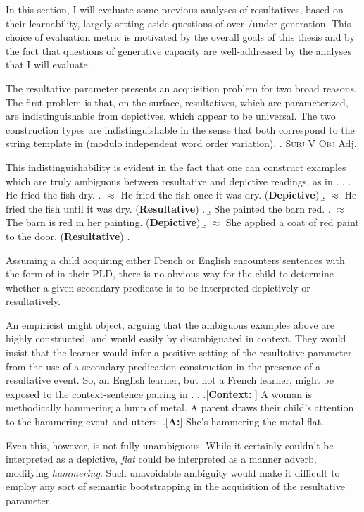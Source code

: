 \documentclass[MilwayThesis]{subfiles}
\begin{document}
In this section, I will evaluate some previous analyses of resultatives, based on their learnability, largely setting aside questions of over-/under-generation.
This choice of evaluation metric is motivated by the overall goals of this thesis and by the fact that questions of generative capacity are well-addressed by the analyses that I will evaluate.

The resultative parameter presents an acquisition problem for two broad reasons.
The first problem is that, on the surface, resultatives, which are parameterized, are indistinguishable from depictives, which appear to be universal.
The two construction types are indistinguishable in the sense that both correspond to the string template in \Next (modulo independent word order variation).
\ex. \textsc{Subj} V \textsc{Obj} Adj.

This indistinguishability is evident in the fact that one can construct examples which are truly ambiguous between resultative and depictive readings, as in \Next.
\ex. 
\a. He fried the fish dry.
\a. $\approx$ He fried the fish once it was dry. (\textbf{Depictive})
\b. $\approx$ He fried the fish until it was dry. (\textbf{Resultative})
\z.
\b. She painted the barn red.
\a. $\approx$ The barn is red in her painting. (\textbf{Depictive})
\b. $\approx$ She applied a coat of red paint to the door. (\textbf{Resultative})
\z.

Assuming a child acquiring either French or English encounters sentences with the form of \LLast in their PLD, there is no obvious way for the child to determine whether a given secondary predicate is to be interpreted depictively or resultatively.

An empiricist might object, arguing that the ambiguous examples above are highly constructed, and would easily by disambiguated in context.
They would insist that the learner would infer a positive setting of the resultative parameter from the use of a secondary predication construction in the presence of a resultative event.
So, an English learner, but not a French learner, might be exposed to the context-sentence pairing in \Next.
\ex. 
\a.[\textbf{Context:} ] A woman is methodically hammering a lump of metal.
A parent draws their child's attention to the hammering event and utters:
\b.[\textbf{A:}] She's hammering the metal flat.

Even this, however, is not fully unambiguous.
While it certainly couldn't be interpreted as a depictive, \textit{flat} could be interpreted as a manner adverb, modifying \textit{hammering}.
Such unavoidable ambiguity would make it difficult to employ any sort of semantic bootstrapping in the acquisition of the resultative parameter.
\end{document}
